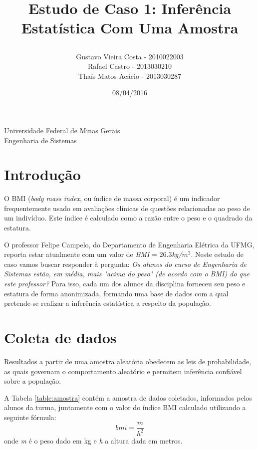 \documentclass[12pt, a4paper]{article}
\title{
	\begin{large}
		Estudo de Caso 1: Inferência Estatística Com Uma Amostra
	\end{large}	}
\author{Gustavo Vieira Costa - 2010022003\\Rafael Castro - 2013030210\\Thaís Matos Acácio - 2013030287}
\date{08/04/2016}
\begin{document}
	\maketitle
	
	\vspace*{-7.5cm}
	{\bf
		\begin{center}
			{\large
				\hspace*{0cm}Universidade Federal de Minas Gerais} \\
			\hspace*{0cm}Engenharia de Sistemas  \\
		\end{center}
	}
	\vspace*{5cm}
	
\section{Introdução}
O BMI (\textit{body mass index}, ou índice de massa corporal) é um indicador frequentemente usado em avaliações clínicas de questões relacionadas ao peso de um indivíduo. Este índice é calculado como a razão entre o peso e o quadrado da estatura.
\par O professor Felipe Campelo, do Departamento de Engenharia Elétrica da UFMG, reporta estar atualmente com um valor de \textit{BMI} = 26.3\textit{kg/$m^{2}$}. Neste estudo de caso vamos buscar responder à pergunta: \textit{Os alunos do curso de Engenharia de Sistemas estão, em média, mais "acima do peso" (de acordo com o BMI) do que este professor?} Para isso, cada um dos alunos da disciplina forneceu seu peso e estatura de forma anonimizada, formando uma base de dados com a qual pretende-se realizar a inferência estatística a respeito da população.	
	
\section{Coleta de dados}
Resultados a partir de uma amostra aleatória obedecem as leis de probabilidade, as quais governam o comportamento aleatório e permitem inferência confiável sobre a população.
\par A Tabela \ref{table:amostra} contém a amostra de dados coletados, informados pelos alunos da turma, juntamente com o valor do índice BMI calculado utilizando a seguinte fórmula:
\begin{equation}
bmi = \frac{m}{h^{2}}
\end{equation}
\newline onde \textit{m} é o peso dado em kg e \textit{h} a altura dada em metros.
	
\end{document}
